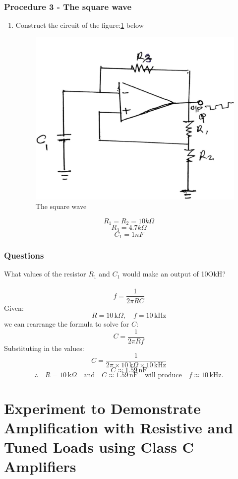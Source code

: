 \documentclass[12pt,a4paper]{article}
\begin{document}
    \subsubsection{Procedure 3 - The square wave}
    \begin{enumerate}
        \item Construct the circuit of the figure:\ref{fig:3} below
        \begin{figure}[H]
            \centering
            \includegraphics[width=0.5\linewidth]{circuit3_1.jpeg}
            \caption{The square wave}
            \label{fig:3}
        \end{figure}
    \end{enumerate}
    $$ R_1 = R_2 = 10k \Omega$$
    $$ R_3 = 4.7k \Omega$$
    $$ C_1 = 1nF $$
    \subsubsection{Questions}
    What values of the resistor $R_1$ and $C_1$ would make an output of 10OkH?\\
    \\
    \[
    f = \frac{1}{2 \pi RC}
    \]
    Given:
    \[
    R = 10 \, \text{k}\Omega, \quad f = 10 \, \text{kHz}
    \]
    we can rearrange the formula to solve for \( C \):
    \[
    C = \frac{1}{2 \pi R f}
    \]
    Substituting in the values:
    \[
    C = \frac{1}{2 \pi \times 10 \, \text{k}\Omega \times 10 \, \text{kHz}}
    \]
    \[
    C \approx 1.59 \, \text{nF}
    \]
    \[
    \therefore \quad R = 10 \, \text{k}\Omega \quad \text{and} \quad C \approx 1.59 \, \text{nF} \quad \text{will produce} \quad f \approx 10 \, \text{kHz}.
    \]

    \section{Experiment to Demonstrate Amplification with Resistive and Tuned Loads using Class C Amplifiers}
\end{document}
